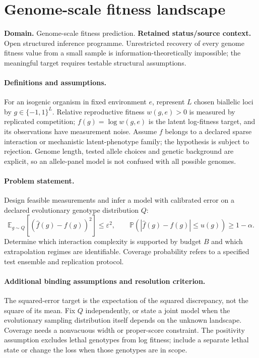 \documentclass[11pt]{article}
\begin{document}
\section*{Genome-scale fitness landscape}
\label{prob:142}
\label{rank:31}
\par\smallskip

\noindent\textbf{Domain.} Genome-scale fitness prediction. \quad \textbf{Retained status/source context.} Open structured inference programme. Unrestricted recovery of every genome fitness value from a small sample is information-theoretically impossible; the meaningful target requires testable structural assumptions.
\paragraph{Definitions and assumptions.} For an isogenic organism in fixed environment $e$, represent $L$ chosen biallelic loci by $g\in\{-1,1\}^L$. Relative reproductive fitness $w(g,e)>0$ is measured by replicated competition; $f(g)=\log w(g,e)$ is the latent log-fitness target, and its observations have measurement noise. Assume $f$ belongs to a declared sparse interaction or mechanistic latent-phenotype family; the hypothesis is subject to rejection. Genome length, tested allele choices and genetic background are explicit, so an allele-panel model is not confused with all possible genomes.
\paragraph{Problem statement.} Design feasible measurements and infer a model with calibrated error on a declared evolutionary genotype distribution $Q$:
\[
\mathbb{E}_{g\sim Q}\!\left[(\widehat f(g)-f(g))^2\right]\leq\varepsilon^2,
\qquad
\mathbb{P}(|\widehat f(g)-f(g)|\leq u(g))\geq1-\alpha.
\]
Determine which interaction complexity is supported by budget $B$ and which extrapolation regimes are identifiable. Coverage probability refers to a specified test ensemble and replication protocol.
\paragraph{Additional binding assumptions and resolution criterion.} The squared-error target is the expectation of the squared discrepancy, not the square of its mean. Fix $Q$ independently, or state a joint model when the evolutionary sampling distribution itself depends on the unknown landscape. Coverage needs a nonvacuous width or proper-score constraint. The positivity assumption excludes lethal genotypes from log fitness; include a separate lethal state or change the loss when those genotypes are in scope.
\end{document}
